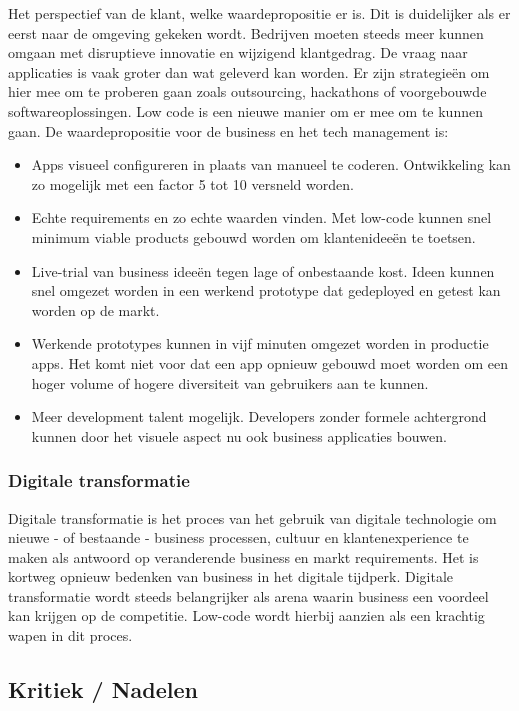 Het perspectief van de klant, welke waardepropositie er is. Dit is duidelijker als er eerst naar de omgeving gekeken wordt. Bedrijven moeten steeds meer kunnen omgaan met disruptieve innovatie en wijzigend klantgedrag. De vraag naar applicaties is vaak groter dan wat geleverd kan worden. Er zijn strategieën om hier mee om te proberen gaan zoals outsourcing, hackathons of voorgebouwde softwareoplossingen. Low code is een nieuwe manier om er mee om te kunnen gaan. De waardepropositie voor de business en het tech management is:
\begin{itemize}
    \item Apps visueel configureren in plaats van manueel te coderen. Ontwikkeling kan zo mogelijk met een factor 5 tot 10 versneld worden.
    \item Echte requirements en zo echte waarden vinden. Met low-code kunnen snel minimum viable products gebouwd worden om klantenideeën te toetsen.
    \item Live-trial van business ideeën tegen lage of onbestaande kost. Ideen kunnen snel omgezet worden in een werkend prototype dat gedeployed en getest kan worden op de markt.
    \item Werkende prototypes kunnen in vijf minuten omgezet worden in productie apps. Het komt niet voor dat een app opnieuw gebouwd moet worden om een hoger volume of hogere diversiteit van gebruikers aan te kunnen.
    \item Meer development talent mogelijk. Developers zonder formele achtergrond kunnen door het visuele aspect nu ook business applicaties bouwen.
\end{itemize} \autocite{Richardson2016}

\subsubsection{Digitale transformatie}

Digitale transformatie is het proces van het gebruik van digitale technologie om nieuwe - of bestaande - business processen, cultuur en klantenexperience te maken als antwoord op veranderende business en markt requirements. Het is kortweg opnieuw bedenken van business in het digitale tijdperk. \autocite{Salesforce}
Digitale transformatie wordt steeds belangrijker als arena waarin business een voordeel kan krijgen op de competitie. Low-code wordt hierbij aanzien als een krachtig wapen in dit proces.

\subsection{Kritiek / Nadelen}

